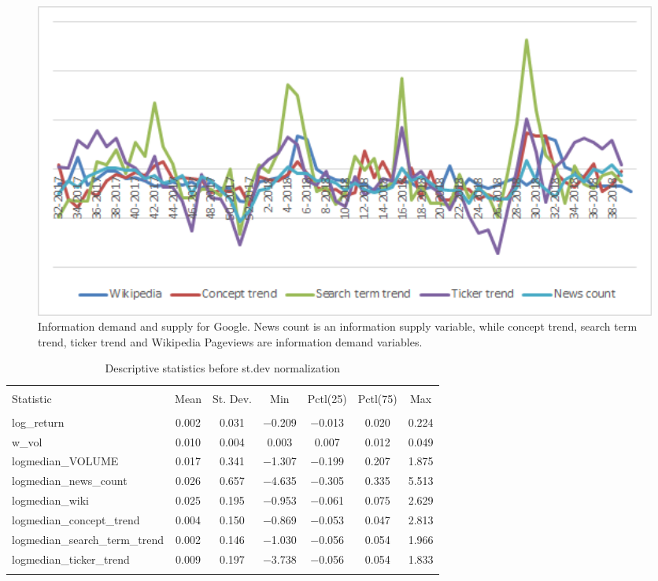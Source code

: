 \begin{figure}[h!]
  \centering
    \includegraphics[width=1\textwidth]{fig/informationSupplyAndDemandGraphsGoogleWithoutYAxis.png}
 \caption{Information demand and supply for Google. News count is an information supply variable, while concept trend, search term trend, ticker trend and Wikipedia Pageviews are information demand variables.}
\label{fig:informationDemandAndSupplyGoogleGraphs}
\end{figure}
\begin{table}[!htbp] \centering 
  \caption{Descriptive statistics before st.dev normalization} 
  \label{tab:desc_stat} 
\begin{tabular}{@{\extracolsep{5pt}}lcccccc} 
\\[-1.8ex]\hline 
\hline \\[-1.8ex] 
Statistic & \multicolumn{1}{c}{Mean} & \multicolumn{1}{c}{St. Dev.} & \multicolumn{1}{c}{Min} & \multicolumn{1}{c}{Pctl(25)} & \multicolumn{1}{c}{Pctl(75)} & \multicolumn{1}{c}{Max} \\ 
\hline \\[-1.8ex] 
log\_return & 0.002 & 0.031 & $-$0.209 & $-$0.013 & 0.020 & 0.224 \\ 
w\_vol & 0.010 & 0.004 & 0.003 & 0.007 & 0.012 & 0.049 \\ 
logmedian\_VOLUME & 0.017 & 0.341 & $-$1.307 & $-$0.199 & 0.207 & 1.875 \\ 
logmedian\_news\_count & 0.026 & 0.657 & $-$4.635 & $-$0.305 & 0.335 & 5.513 \\ 
logmedian\_wiki & 0.025 & 0.195 & $-$0.953 & $-$0.061 & 0.075 & 2.629 \\ 
logmedian\_concept\_trend & 0.004 & 0.150 & $-$0.869 & $-$0.053 & 0.047 & 2.813 \\ 
logmedian\_search\_term\_trend & 0.002 & 0.146 & $-$1.030 & $-$0.056 & 0.054 & 1.966 \\ 
logmedian\_ticker\_trend & 0.009 & 0.197 & $-$3.738 & $-$0.056 & 0.054 & 1.833 \\ 
\hline \\[-1.8ex] 
\end{tabular} 
\end{table} 

